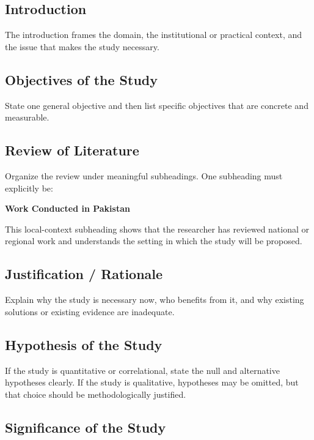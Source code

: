 \documentclass[11pt,a4paper]{article}
\begin{document}
\subsection{Introduction}

The introduction frames the domain, the institutional or practical context, and the issue that makes the study necessary.

\subsection{Objectives of the Study}

State one general objective and then list specific objectives that are concrete and measurable.

\subsection{Review of Literature}

Organize the review under meaningful subheadings. One subheading must explicitly be:

\begin{center}
\textbf{Work Conducted in Pakistan}
\end{center}

This local-context subheading shows that the researcher has reviewed national or regional work and understands the setting in which the study will be proposed.

\subsection{Justification / Rationale}

Explain why the study is necessary now, who benefits from it, and why existing solutions or existing evidence are inadequate.

\subsection{Hypothesis of the Study}

If the study is quantitative or correlational, state the null and alternative hypotheses clearly. If the study is qualitative, hypotheses may be omitted, but that choice should be methodologically justified.

\subsection{Significance of the Study}
\end{document}
